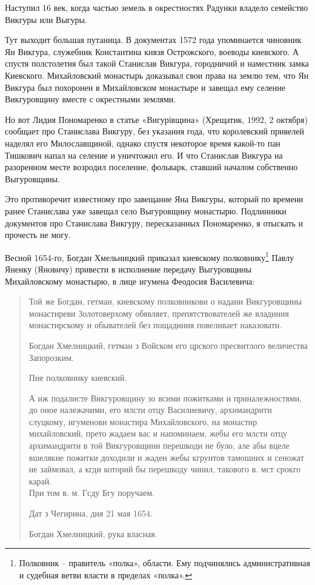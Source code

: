 
Наступил 16 век, когда частью земель в окрестностях Радунки владело семейство Викгуры или Выгуры. 

Тут выходит большая путаница. В документах 1572 года упоминается чиновник Ян Викгура, служебник Константина князя Острожского, воеводы киевского. А спустя полстолетия был такой Станислав Викгура, городничий и наместник замка Киевского. Михайловский монастырь доказывал свои права на землю тем,  что Ян Викгура был похоронен в Михайловском монастыре и завещал ему селение Викгуровщину вместе с окрестными землями.

Но вот Лидия Пономаренко в статье «Вигурівщина» (Хрещатик, 1992, 2 октября) сообщает про Станислава Викгуру, без указания года, что королевский привелей наделял его Милославщиной, однако спустя некоторое время какой-то пан Тишкович напал на селение и уничтожил его. И что Станислав Викгура на разоренном месте возродил поселение, фольварк, ставший началом собственно Выгуровщины.

Это противоречит известному про завещание Яна Викгуры, который по времени ранее Станислава уже завещал село Выгуровщину монастырю. Подлинники документов про Станислава Викгуру, пересказанных Пономаренко, я отыскать и прочесть не могу.

Весной 1654-го, Богдан Хмельницкий приказал киевскому полковнику\footnote{Полковник – правитель «полка», области. Ему подчинялись административная и судебная ветви власти в пределах «полка».} Павлу Яненку (Яновичу) привести в исполнение передачу Выгуровщины Михайловскому монастырю, в лице игумена Феодосия Василевича\cite[82]{mihdocs}:

\begin{quotation}
Той же Богдан, гетман, киевскому полковникови о надани Викгуровщины монастиреви Золотоверхому обявляет, препятствователей же владиния монастирскому и обывателей без пощадиния повеливает наказовати.

Богдан Хмелницкий, гетман з Войском его црского пресвитлого величества Запорозким.

Пне полковнику киевский.

А иж подалисте Викгуровщину зо всими пожитками и приналежностями, до оное належачими, его млсти отцу Василиевичу, архимандрити слуцкому, игуменови монастира Михайловского, на монастир михайловский, прето жадаем вас и напоминаем, жебы его млсти отцу архимандрити в той Викгуровщини перешкоди не було, але абы вцеле вшелякие пожитки доходили и жаден жебы кгрунтов тамошних и сеножат не займовал, а кгди которий бы перешкоду чинил, такового в. мст срокго карай.\\

При том в. м. Гсду Бгу поручаем.

Дат з Чегирина, дня 21 мая 1654.

Богдан Хмелницкий, рука власная.
\end{quotation}

